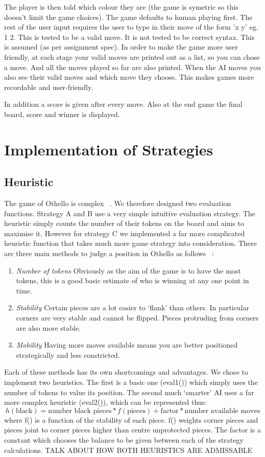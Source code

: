 \documentclass[12pt]{article}
\begin{document}
The player is then told which colour they are (the game is symetric so this doesn't limit the game choices). The game defaults to human playing first. The rest of the user input requires the user to type in their move of the form 'x y' eg. 1 2. This is tested to be a valid move. It is not tested to be correct syntax. This is assumed (as per assignment spec).
In order to make the game more user friendly, at each stage your valid moves are printed out as a list, so you can chose a move. And all the moves played so far are also printed. When the AI moves you also see their valid moves and which move they choose. This makes games more recordable and user-friendly.

In addition a score is given after every move. Also at the end game the final board, score and winner is displayed.

\section{Implementation of Strategies}
\subsection{Heuristic}
The game of Othello is complex ~\cite{post}. We therefore designed two evaluation functions. Strategy A and B use a very simple intuitive evaluation strategy. The heuristic simply counts the number of their tokens on the board and aims to maximise it. However for strategy C we implemented a far more complicated heuristic function that takes much more game strategy into consideration. There are three main methods to judge a position in Othello as follows ~\cite{strategy}:
\begin{enumerate}
\item \emph{Number of tokens} Obviously as the aim of the game is to have the most tokens, this is a good basic estimate of who is winning at any one point in time.
\item \emph{Stability} Certain pieces are a lot easier to `flank' than others. In particular corners are very stable and cannot be flipped. Pieces protruding from corners are also more stable.
\item \emph{Mobility} Having more moves available means you are better positioned strategically and less constricted.
\end{enumerate}
Each of these methods has its own shortcomings and advantages. We chose to implement two heuristics. The first is a basic one (eval1()) which simply uses the number of tokens to value its position. The second much `smarter' AI uses a far more complex heuristic (eval2()), which can be represented thus:
\begin{equation}
h(\mbox{black}) = \mbox{number black pieces}*f(\mbox{pieces}) + \mbox{factor}*\mbox{number available moves}
\end{equation}
where f() is a function of the stability of each piece. f() weights corner pieces and pieces joint to corner pieces higher than centre unprotected pieces. The factor is a constant which chooses the balance to be given between each of the strategy calculations.
TALK ABOUT HOW BOTH HEURISTICS ARE ADMISSABLE
\end{document}
